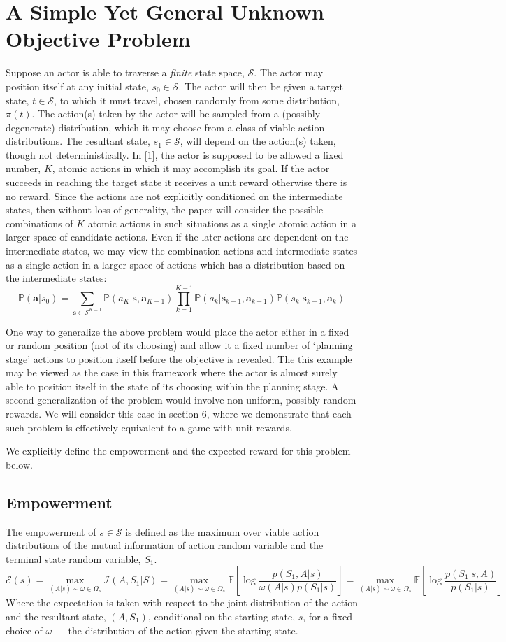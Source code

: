 \documentclass{article}
\newcommand{\EE}{\mathbb{E}}
\newcommand{\PP}{\mathbb{P}}
\newcommand{\Ss}{\mathcal{S}}
\newcommand{\Ii}{\mathcal{I}}
\newcommand{\Ee}{\mathcal{E}}
\begin{document}
\section{A Simple Yet General Unknown Objective Problem}
Suppose an actor is able to traverse a \textit{finite} state space, $\Ss$. 
The actor may position itself at any initial state, $s_0\in \Ss$. 
The actor will then be given a target state, $t\in \Ss$, to which it must travel, chosen randomly from some distribution, $\pi(t)$. 
The action(s) taken by the actor will be sampled from a (possibly degenerate) distribution, which it may choose from a class of viable action distributions. 
The resultant state, $s_1\in\Ss$, will depend on the action(s) taken, though not deterministically.  
In [1], the actor is supposed to be allowed a fixed number, $K$, atomic actions in which it may accomplish its goal. If the actor succeeds in reaching the target state it receives a unit reward otherwise there is no reward. Since the actions are not explicitly conditioned on the intermediate states, then without loss of generality, the paper will consider the possible combinations of $K$ atomic actions in such situations as a single atomic action in a larger space of candidate actions. Even if the later actions are dependent on the intermediate states, we may view the combination actions and intermediate states as a single action in a larger space of actions which has a distribution based on the intermediate states:
\[\PP(\mathbf{a}|s_0) = \sum_{\mathbf{s}\in \Ss^{K-1}} \PP(a_K|\mathbf{s},\mathbf{a}_{K-1}) \prod_{k=1}^{K-1} \PP(a_k|\mathbf{s}_{k-1},\mathbf{a}_{k-1})\PP(s_{k}|\mathbf{s}_{k-1},\mathbf{a}_k)\]

One way to generalize the above problem would place the actor either in a fixed or random position (not of its choosing) and allow it a fixed number of `planning stage' actions to position itself before the objective is revealed. 
The this example may be viewed as the case in this framework where the actor is almost surely able to position itself in the state of its choosing within the planning stage. A second generalization of the problem would involve non-uniform, possibly random rewards. We will consider this case in section 6, where we demonstrate that each such problem is effectively equivalent to a game with unit rewards. 

We explicitly define the empowerment and the expected reward for this problem below.

\subsection{Empowerment}
The empowerment of $s\in\mathcal{S}$ is defined as the maximum over viable action distributions of the mutual information of action random variable and the terminal state random variable, $S_1$.
\[\Ee(s)=\max_{(A|s)\sim\omega\in\Omega_s}\Ii(A,S_1|S)=\max_{(A|s)\sim\omega\in\Omega_s}\EE\left[\log\frac{p(S_1,A|s)}{\omega(A|s)p(S_1|s)}\right]=\max_{(A|s)\sim\omega\in\Omega_s}\EE\left[\log\frac{p(S_1|s,A)}{p(S_1|s)}\right] \]
Where the expectation is taken with respect to the joint distribution of the action and the resultant state, $(A,S_1)$, conditional on the starting state, $s$, for a fixed choice of $\omega$ --- the distribution of the action given the starting state. 
\end{document}
